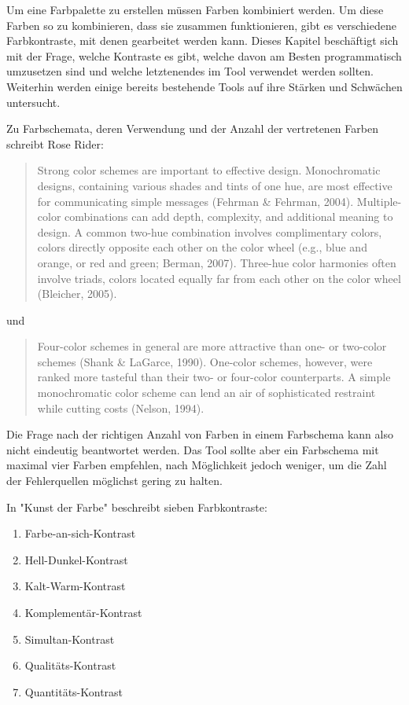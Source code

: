 Um eine Farbpalette zu erstellen müssen Farben kombiniert werden. Um diese Farben so zu kombinieren, dass sie zusammen funktionieren, gibt es verschiedene Farbkontraste, mit denen gearbeitet werden kann.
Dieses Kapitel beschäftigt sich mit der Frage, welche Kontraste es gibt, welche davon am Besten programmatisch umzusetzen sind und welche letztenendes im Tool verwendet werden sollten.
Weiterhin werden einige bereits bestehende Tools auf ihre Stärken und Schwächen untersucht.

Zu Farbschemata, deren Verwendung und der Anzahl der vertretenen Farben schreibt Rose Rider:

\begin{quote}Strong color schemes are important to effective design. Monochromatic designs, containing various shades and tints of one hue, are most effective for communicating simple messages (Fehrman \& Fehrman, 2004). Multiple-color combinations can add depth, complexity, and additional meaning to design. A common two-hue combination involves complimentary colors, colors directly opposite each other on the color wheel (e.g., blue and orange, or red and green; Berman, 2007). Three-hue color harmonies often involve triads, colors located equally far from each other on the color wheel (Bleicher, 2005).
\end{quote}

und

\begin{quote}
Four-color schemes in general are more attractive than one- or two-color schemes (Shank \& LaGarce, 1990). One-color schemes, however, were ranked more tasteful than their two- or four-color counterparts. A simple monochromatic color scheme can lend an air of sophisticated restraint while cutting costs (Nelson, 1994).
\end{quote}

Die Frage nach der richtigen Anzahl von Farben in einem Farbschema kann also nicht eindeutig beantwortet werden. Das Tool sollte aber ein Farbschema mit maximal vier Farben empfehlen, nach Möglichkeit jedoch weniger, um die Zahl der Fehlerquellen möglichst gering zu halten.

In "Kunst der Farbe" beschreibt \cite{Itten201006} sieben Farbkontraste:

\begin{enumerate}
  \item Farbe-an-sich-Kontrast
  \item Hell-Dunkel-Kontrast
  \item Kalt-Warm-Kontrast
  \item Komplementär-Kontrast
  \item Simultan-Kontrast
  \item Qualitäts-Kontrast
  \item Quantitäts-Kontrast
\end{enumerate}

